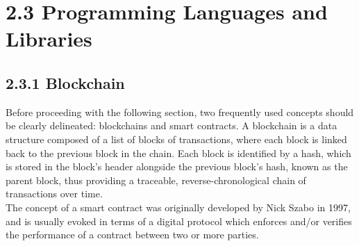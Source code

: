 \section{2.3 Programming Languages and
Libraries}\label{programming-languages-and-libraries}

\subsection{2.3.1 Blockchain}\label{blockchain}

Before proceeding with the following section, two frequently used
concepts should be clearly delineated: blockchains and smart contracts.
A blockchain is a data structure composed of a list of blocks of
transactions, where each block is linked back to the previous block in
the chain\cite{antonopoulos2014mastering}. Each block is identified by a
hash, which is stored in the block's header alongside the previous
block's hash, known as the parent block\cite{antonopoulos2014mastering}, thus providing a
traceable, reverse-chronological chain of transactions over time.\\
The concept of a smart contract was originally developed by Nick Szabo
in 1997, and is usually evoked in terms of a digital protocol which
enforces and/or verifies the performance of a contract between two or
more
parties\cite{1szabo}.


